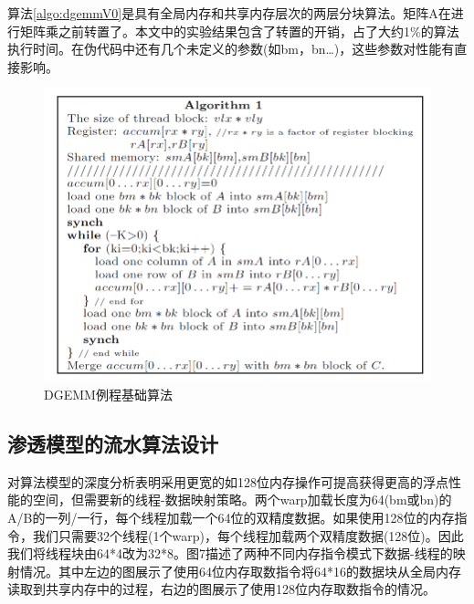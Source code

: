 \begin{flushleft}
算法\ref{algo:dgemmV0}是具有全局内存和共享内存层次的两层分块算法。矩阵A在进行矩阵乘之前转置了。本文中的实验结果包含了转置的开销，占了大约1\%的算法执行时间。在伪代码中还有几个未定义的参数(如bm，bn…)，这些参数对性能有直接影响。
\begin{figure}[htbp]
	\begin{center}
		\includegraphics[scale=0.8]{Img/Chap_Algorithm/dgemmV0}
		\caption{DGEMM例程基础算法} \label{fig:dgemmV0}
	\end{center}
\end{figure}

\subsection{渗透模型的流水算法设计}
对算法模型的深度分析表明采用更宽的如128位内存操作可提高获得更高的浮点性能的空间\citep{}，但需要新的线程-数据映射策略。两个warp加载长度为64(bm或bn)的A/B的一列/一行，每个线程加载一个64位的双精度数据。如果使用128位的内存指令，我们只需要32个线程(1个warp)，每个线程加载两个双精度数据(128位)。因此我们将线程块由64*4改为32*8。图7描述了两种不同内存指令模式下数据-线程的映射情况。其中左边的图展示了使用64位内存取数指令将64*16的数据块从全局内存读取到共享内存中的过程，右边的图展示了使用128位内存取数指令的情况。


\end{flushleft}
